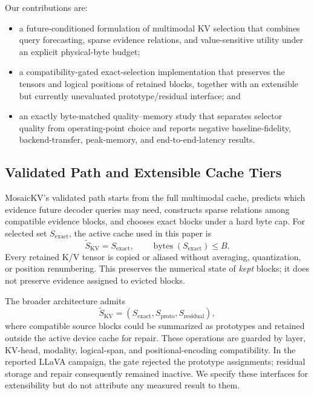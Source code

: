 Our contributions are:
\begin{itemize}
  \item a future-conditioned formulation of multimodal KV selection that
  combines query forecasting, sparse evidence relations, and value-sensitive
  utility under an explicit physical-byte budget;
  \item a compatibility-gated exact-selection implementation that preserves
  the tensors and logical positions of retained blocks, together with an
  extensible but currently unevaluated prototype/residual interface; and
  \item an exactly byte-matched quality--memory study that separates selector
  quality from operating-point choice and reports negative baseline-fidelity,
  backend-transfer, peak-memory, and end-to-end-latency results.
\end{itemize}

\subsection{Validated Path and Extensible Cache Tiers}
\label{sec:validated-design-scope}

MosaicKV's validated path starts from the full multimodal cache, predicts
which evidence future decoder queries may need, constructs sparse relations
among compatible evidence blocks, and chooses exact blocks under a hard byte
cap.  For selected set \(S_{\mathrm{exact}}\), the active cache used in this
paper is
\begin{equation}
  \widetilde S_{\mathrm{KV}}=S_{\mathrm{exact}},\qquad
  \operatorname{bytes}(S_{\mathrm{exact}})\le B.
\end{equation}
Every retained K/V tensor is copied or aliased without averaging,
quantization, or position renumbering.  This preserves the numerical state of
\emph{kept} blocks; it does not preserve evidence assigned to evicted blocks.

The broader architecture admits
\begin{equation}
  \widetilde S_{\mathrm{KV}}=
  (S_{\mathrm{exact}},S_{\mathrm{proto}},S_{\mathrm{residual}}),
\end{equation}
where compatible source blocks could be summarized as prototypes and retained
outside the active device cache for repair.  These operations are guarded by
layer, KV-head, modality, logical-span, and positional-encoding compatibility.
In the reported LLaVA campaign, the gate rejected the prototype assignments;
residual storage and repair consequently remained inactive.  We specify these
interfaces for extensibility but do not attribute any measured result to
them.

